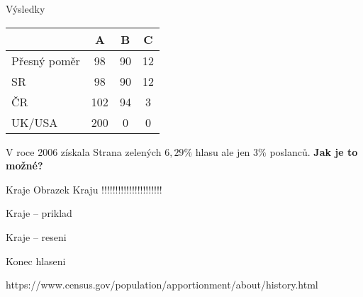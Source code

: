 \documentclass[17pt]{beamer}
\begin{document}
\begin{frame}{Výsledky}
\begin{center}
\begin{tabular}{|l|c|c|c|} \hline
  & A & B & C \\ \hline 
Přesný poměr & 98 & 90 & 12\\ \hline
SR & 98 & 90 & 12\\ \hline
ČR & 102 & 94 & 3\\ \hline
UK/USA & 200 & 0 & 0\\ \hline
\end{tabular}
\end{center} 
V roce 2006 získala Strana zelených $6,29\%$ hlasu ale jen $3\%$ poslanců. 
\textbf{Jak je to možné?}
\end{frame}

\begin{frame}{Kraje}
Obrazek Kraju !!!!!!!!!!!!!!!!!!!!!!
\end{frame}

\begin{frame}{Kraje -- priklad}

\end{frame}

\begin{frame}{Kraje -- reseni}

\end{frame}

\begin{frame}{Konec hlaseni}

\end{frame}

https://www.census.gov/population/apportionment/about/history.html
\end{document}

